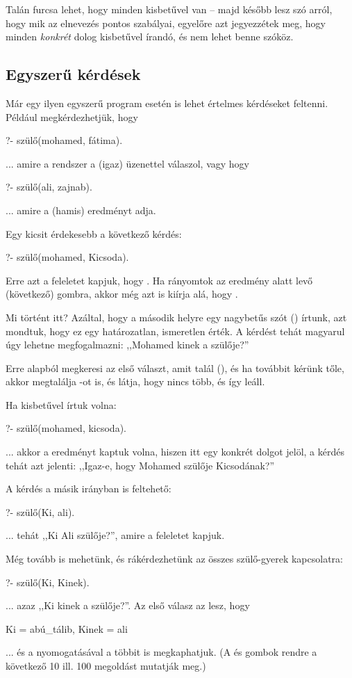 Talán furcsa lehet, hogy minden kisbetűvel van --
majd később lesz szó arról, hogy mik az elnevezés
pontos szabályai, egyelőre azt jegyezzétek meg,
hogy minden \emph{konkrét} dolog kisbetűvel
írandó, és nem lehet benne szóköz.

\subsection*{Egyszerű kérdések}

Már egy ilyen egyszerű program esetén is lehet
értelmes kérdéseket feltenni. Például
megkérdezhetjük, hogy
\begin{prolog}
?- szülő(mohamed, fátima).
\end{prolog}
... amire a rendszer a  (igaz) üzenettel
válaszol, vagy hogy
\begin{prolog}
?- szülő(ali, zajnab).
\end{prolog}
... amire a  (hamis) eredményt adja.

Egy kicsit érdekesebb a következő kérdés:
\begin{prolog}
?- szülő(mohamed, Kicsoda).
\end{prolog}
Erre azt a feleletet kapjuk, hogy . Ha rányomtok az eredmény alatt levő  (következő) gombra, akkor még azt is kiírja alá, hogy .

Mi történt itt? Azáltal, hogy a második helyre egy nagybetűs szót () írtunk, azt mondtuk, hogy ez egy határozatlan, ismeretlen érték. A kérdést tehát magyarul úgy lehetne megfogalmazni: ,,Mohamed kinek a szülője?''

Erre alapból megkeresi az első választ, amit talál (), és ha továbbit kérünk tőle, akkor megtalálja -ot is, és látja, hogy nincs több, és így leáll.

Ha kisbetűvel írtuk volna:
\begin{prolog}
?- szülő(mohamed, kicsoda).
\end{prolog}
... akkor a  eredményt kaptuk volna, hiszen  itt egy konkrét dolgot jelöl, a kérdés tehát azt jelenti: ,,Igaz-e, hogy Mohamed szülője Kicsodának?''

A kérdés a másik irányban is feltehető:
\begin{prolog}
?- szülő(Ki, ali).
\end{prolog}
... tehát ,,Ki Ali szülője?'', amire a  feleletet kapjuk.

Még tovább is mehetünk, és rákérdezhetünk az összes szülő-gyerek kapcsolatra:
\begin{prolog}
?- szülő(Ki, Kinek).
\end{prolog}
... azaz ,,Ki kinek a szülője?''. Az első válasz az lesz, hogy
\begin{prolog}
Ki = abú_tálib,
Kinek = ali
\end{prolog}
... és a  nyomogatásával a többit is megkaphatjuk. (A  és  gombok rendre a következő 10 ill. 100 megoldást mutatják meg.)

